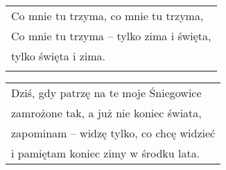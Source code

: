 \documentclass[a5paper]{article}
\begin{document}
\noindent
\begin{tabular}{@{}p{7.50cm}@{}}
Co mnie tu trzyma, co mnie tu trzyma, \\
Co mnie tu trzyma – tylko zima i święta, \\
tylko święta i zima. \\ \\
\end{tabular}

\noindent
\begin{tabular}{@{}p{8.50cm}@{}}
Dziś, gdy patrzę na te moje Śniegowice \\
zamrożone tak, a już nie koniec świata, \\
zapominam – widzę tylko, co chcę widzieć \\
i pamiętam koniec zimy w środku lata.
\end{tabular}
\end{document}
